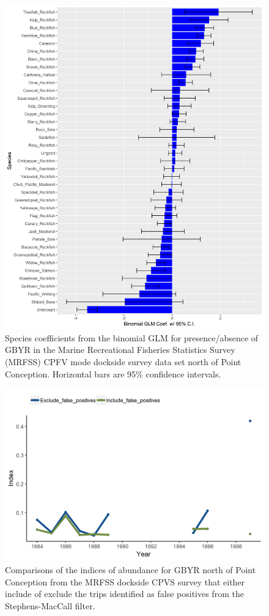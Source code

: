 \documentclass[12pt,]{article}
\begin{document}
\begin{figure}
\centering
\includegraphics{Figures/Fleet10_SM_filter.png}
\caption{Species coefficients from the binomial GLM for presence/absence
of GBYR in the Marine Recreational Fisheries Statistics Survey (MRFSS)
CPFV mode dockside survey data set north of Point Conception. Horizontal
bars are 95\% confidence intervals. \label{fig:Fleet10_SM_filter}}
\end{figure}

\begin{figure}
\centering
\includegraphics{Figures/MRFSS_index_N_SM_falsepos.png}
\caption{Comparisons of the indices of abundance for GBYR north of Point
Conception from the MRFSS dockside CPVS survey that either include of
exclude the trips identified as false positives from the
Stephens-MacCall filter. \label{fig:MRFSS_index_N_SM_falsepos}}
\end{figure}
\end{document}
